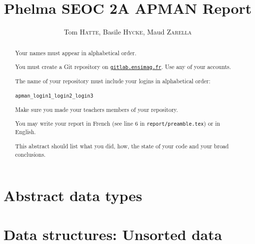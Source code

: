 \documentclass[a4paper,notitlepage]{report}
\newcommand{\authorOne}   {Tom    \textsc{Hatte}}
\newcommand{\authorTwo}   {Basile \textsc{Hycke}}
\newcommand{\authorThree} {Maud   \textsc{Zarella}}
\begin{document}
\author{\authorOne, \authorTwo, \authorThree}
\title{Phelma {SEOC} 2A {APMAN} Report}

\hypersetup{pageanchor=false}
\begin{titlepage}
  \maketitle

  \begin{abstract}

    Your names must appear in alphabetical order.

    You must create a Git repository on \href{https://gitlab.ensimag.fr}{\texttt{gitlab.ensimag.fr}}. Use any of your accounts.

    The name of your repository must include your logins in alphabetical order:

    \hspace{3cm}\texttt{apman\_login1\_login2\_login3}

    Make sure you made your teachers members of your repository. 

    You may write your report in French (see line 6 in \texttt{report/preamble.tex}) or in English.

    This abstract should list what you did, how, the state of your code and your broad conclusions.
  \end{abstract}

\end{titlepage}
\hypersetup{pageanchor=true}

\tableofcontents

\listoffigures
{}




\part{Abstract data types}








\part{Data structures: Unsorted data}
\end{document}

